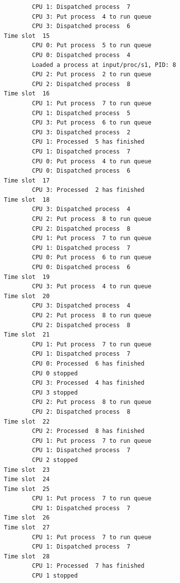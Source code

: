 \documentclass[a4paper]{article}
\numberwithin{equation}{section}
\begin{document}
\begin{mdframed}[leftline=false,rightline=false,backgroundcolor=grey!10,nobreak=false]
\begin{verbatim}
        CPU 1: Dispatched process  7
        CPU 3: Put process  4 to run queue
        CPU 3: Dispatched process  6
Time slot  15
        CPU 0: Put process  5 to run queue
        CPU 0: Dispatched process  4
        Loaded a process at input/proc/s1, PID: 8
        CPU 2: Put process  2 to run queue
        CPU 2: Dispatched process  8
Time slot  16
        CPU 1: Put process  7 to run queue
        CPU 1: Dispatched process  5
        CPU 3: Put process  6 to run queue
        CPU 3: Dispatched process  2
        CPU 1: Processed  5 has finished
        CPU 1: Dispatched process  7
        CPU 0: Put process  4 to run queue
        CPU 0: Dispatched process  6
Time slot  17
        CPU 3: Processed  2 has finished
Time slot  18
        CPU 3: Dispatched process  4
        CPU 2: Put process  8 to run queue
        CPU 2: Dispatched process  8
        CPU 1: Put process  7 to run queue
        CPU 1: Dispatched process  7
        CPU 0: Put process  6 to run queue
        CPU 0: Dispatched process  6
Time slot  19
        CPU 3: Put process  4 to run queue
Time slot  20
        CPU 3: Dispatched process  4
        CPU 2: Put process  8 to run queue
        CPU 2: Dispatched process  8
Time slot  21
        CPU 1: Put process  7 to run queue
        CPU 1: Dispatched process  7
        CPU 0: Processed  6 has finished
        CPU 0 stopped
        CPU 3: Processed  4 has finished
        CPU 3 stopped
        CPU 2: Put process  8 to run queue
        CPU 2: Dispatched process  8
Time slot  22
        CPU 2: Processed  8 has finished
        CPU 1: Put process  7 to run queue
        CPU 1: Dispatched process  7
        CPU 2 stopped
Time slot  23
Time slot  24
Time slot  25
        CPU 1: Put process  7 to run queue
        CPU 1: Dispatched process  7
Time slot  26
Time slot  27
        CPU 1: Put process  7 to run queue
        CPU 1: Dispatched process  7
Time slot  28
        CPU 1: Processed  7 has finished
        CPU 1 stopped


\end{verbatim}
\end{mdframed}
\end{document}
